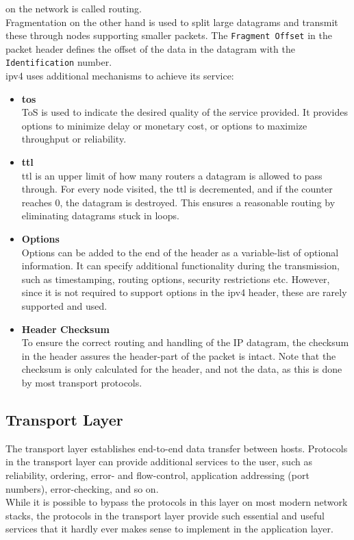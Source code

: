on the network is called routing\cite{RFC0791}.\\
Fragmentation on the other hand is used to split large datagrams and transmit
these through nodes supporting smaller packets. The \texttt{Fragment Offset} in
the packet header defines the offset of the data in the datagram with the
\texttt{Identification} number.\\
\gls{ipv4} uses additional mechanisms to achieve its service:
\begin{itemize}
	\item \textbf{\gls{tos}}\\
	ToS is used to indicate the desired quality of the service provided.
	It provides options to minimize delay or monetary cost, or options to
		maximize throughput or
		reliability\cite{tcpip_illustrated_vol1}\cite{RFC0791}.
	\item \textbf{\gls{ttl}}\\
	\gls{ttl} is an upper limit of how many routers a datagram is allowed
		to pass through. For every node visited, the \gls{ttl} is decremented,
		and if the counter reaches $0$, the datagram is destroyed. This
		ensures a reasonable routing by eliminating datagrams stuck in
		loops\cite{RFC0791}.
	\item \textbf{Options}\\
	Options can be added to the end of the header as a variable-list of
		optional information. It can specify additional functionality
		during the transmission, such as timestamping, routing options,
		security restrictions etc. However, since it is not required
		to support options in the \gls{ipv4} header, these are rarely
		supported and used\cite{tcpip_illustrated_vol1}.
	\item \textbf{Header Checksum}\\
	To ensure the correct routing and handling of the IP datagram, the
		checksum in the header assures the header-part of the packet is
		intact. Note that the checksum is only calculated for the
		header, and not the data, as this is done by most transport
		protocols.
\end{itemize}


\subsection{Transport Layer}
The transport layer establishes end-to-end data transfer between hosts.
Protocols in the transport layer can provide additional services to the user,
such as reliability, ordering, error- and flow-control, application addressing
(port numbers), error-checking, and so on.\\
While it is possible to bypass the protocols in this layer on most modern
network stacks, the protocols in the transport layer provide such essential
and useful services that it hardly ever makes sense to implement in the
application layer.

